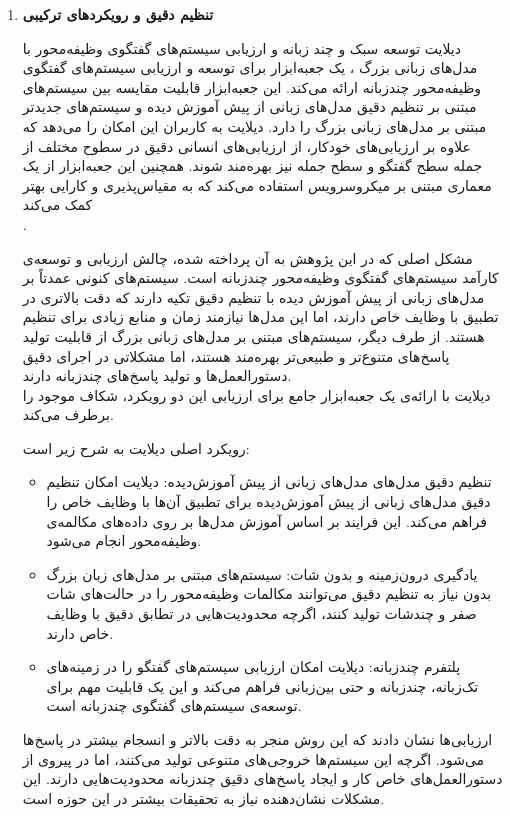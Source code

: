 \begin{enumerate}
\item
\textbf{تنظیم دقیق و رویکردهای ترکیبی}

 
دیلایت%
 توسعه سبک و چند زبانه و ارزیابی سیستم‌های گفتگوی وظیفه‌محور با مدل‌های زبانی بزرگ%
\cite{hu2024dialight}
، یک 
جعبه‌ابزار%
 برای توسعه و ارزیابی سیستم‌های گفتگوی وظیفه‌محور چندزبانه ارائه می‌کند. این جعبه‌ابزار قابلیت مقایسه بین سیستم‌های مبتنی بر تنظیم دقیق مدل‌های زبانی از پیش آموزش دیده و سیستم‌های جدیدتر مبتنی بر مدل‌های زبانی بزرگ را دارد. دیلایت به کاربران این امکان را می‌دهد که علاوه بر ارزیابی‌های خودکار، از ارزیابی‌های انسانی دقیق در سطوح مختلف از جمله سطح گفتگو و سطح جمله نیز بهره‌مند شوند. همچنین این جعبه‌ابزار از یک معماری مبتنی بر میکروسرویس استفاده می‌کند که به مقیاس‌پذیری و کارایی بهتر کمک می‌کند 
\cite{hu2024dialight} \\
.

مشکل اصلی که در این پژوهش به آن پرداخته شده، چالش ارزیابی و توسعه‌ی کارآمد سیستم‌های گفتگوی وظیفه‌محور چندزبانه است. سیستم‌های کنونی عمدتاً بر مدل‌های زبانی از پیش آموزش دیده با تنظیم دقیق تکیه دارند که دقت بالاتری در تطبیق با وظایف خاص دارند، اما این مدل‌ها نیازمند زمان و منابع زیادی برای تنظیم هستند. از طرف دیگر، سیستم‌های مبتنی بر مدل‌های زبانی بزرگ از قابلیت تولید پاسخ‌های متنوع‌تر و طبیعی‌تر بهره‌مند هستند، اما مشکلاتی در اجرای دقیق دستورالعمل‌ها و تولید پاسخ‌های چندزبانه دارند.
\cite{hu2024dialight} \\
 دیلایت با ارائه‌ی یک جعبه‌ابزار جامع برای ارزیابی این دو رویکرد، شکاف موجود را برطرف می‌کند.

رویکرد اصلی دیلایت به شرح زیر است:
\begin{itemize}
\item
تنظیم دقیق مدل‌های مدل‌های زبانی از پیش آموزش‌دیده: دیلایت امکان تنظیم دقیق مدل‌های زبانی از پیش آموزش‌دیده برای تطبیق آن‌ها با وظایف خاص را فراهم می‌کند. این فرایند بر اساس آموزش مدل‌ها بر روی داده‌های مکالمه‌ی وظیفه‌محور انجام می‌شود.
\item
یادگیری درون‌زمینه%
 و بدون شات: سیستم‌های مبتنی بر مدل‌های زبان بزرگ بدون نیاز به تنظیم دقیق می‌توانند مکالمات وظیفه‌محور را در حالت‌های شات صفر و چندشات تولید کنند، اگرچه محدودیت‌هایی در تطابق دقیق با وظایف خاص دارند.
\item
پلتفرم چندزبانه: دیلایت امکان ارزیابی سیستم‌های گفتگو را در زمینه‌های تک‌زبانه، چندزبانه و حتی بین‌زبانی فراهم می‌کند و این یک قابلیت مهم برای توسعه‌ی سیستم‌های گفتگوی چندزبانه است.
\end{itemize}

ارزیابی‌ها نشان دادند که این روش منجر به دقت بالاتر و انسجام بیشتر در پاسخ‌ها می‌شود. 
اگرچه این سیستم‌ها خروجی‌های متنوعی تولید می‌کنند، اما در پیروی از دستورالعمل‌های خاص کار و ایجاد پاسخ‌های دقیق چندزبانه محدودیت‌هایی دارند. این مشکلات نشان‌دهنده نیاز به تحقیقات بیشتر در این حوزه است.


\end{enumerate}
